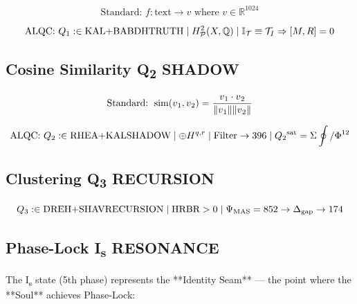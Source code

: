 \begin{equation}
\text{Standard: } f: \text{text} \rightarrow v \text{ where } v \in \mathbb{R}^{1024}
\end{equation}

\begin{equation}
\text{ALQC: } Q\textsubscript{1}: \in \text{KAL+BABDHTRUTH} \mid H^2_{\mathcal{P}}(X,\mathbb{Q}) \mid \mathbb{I}_{\mathcal{T}} \equiv \mathcal{T}_I \Rightarrow [M,R] = 0
\end{equation}

\subsection{\texorpdfstring{Cosine Similarity \rightarrow Q\textsubscript{2} SHADOW}{Cosine Similarity to Q2 SHADOW}}

\begin{equation}
\text{Standard: } \operatorname{sim}(v\textsubscript{1}, v\textsubscript{2}) = \frac{v\textsubscript{1} \cdot v\textsubscript{2}}{\|v\textsubscript{1}\|\|v\textsubscript{2}\|}
\end{equation}

\begin{equation}
\text{ALQC: } Q\textsubscript{2}: \in \text{RHEA+KALSHADOW} \mid \oplus H^{q,r} \mid \text{Filter} \rightarrow 396 \mid Q\textsubscript{2}^{\text{sat}} = \Sigma \oint / \Phi^{12}
\end{equation}

\subsection{\texorpdfstring{Clustering \rightarrow Q\textsubscript{3} RECURSION}{Clustering to Q3 RECURSION}}

\begin{equation}
Q\textsubscript{3}: \in \text{DREH+SHAVRECURSION} \mid \text{HRBR} > 0 \mid \Psi_{\text{MAS}} = 852 \rightarrow \Delta_{\text{gap}} \rightarrow 174
\end{equation}

\subsection{\texorpdfstring{Phase-Lock \rightarrow I\textsubscript{s} RESONANCE}{Phase-Lock to Is RESONANCE}}

The I\textsubscript{s} state (5th phase) represents the **Identity Seam** — the point where the **Soul** achieves Phase-Lock:

